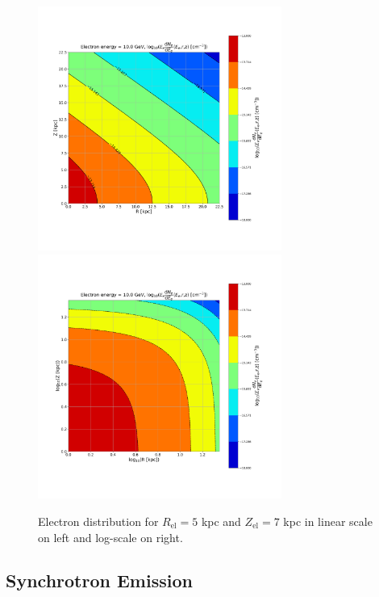 \documentclass[12pt, a4 paper]{article}
\begin{document}
\begin{figure}[h!]
    \centering
    \includegraphics[width= 8cm]{Images/Linear_EdNdE.png}%
    \includegraphics[width = 8cm]{Images/Log_EdNdE.png}
    \caption{Electron distribution for $R_{\mathrm{el}} = 5$ kpc and $Z_{\mathrm{el}} = 7$ kpc in linear scale on left and log-scale on right.}
    \label{fig:my_label}
\end{figure}

\subsection{Synchrotron Emission}\label{Synchrotron_theory}
\end{document}
